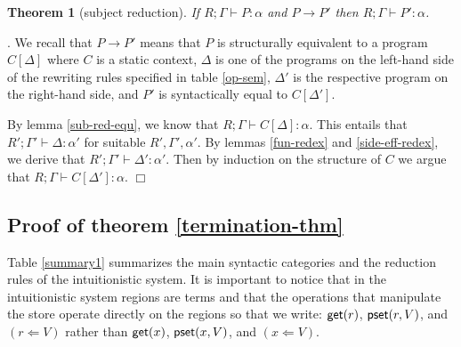 \documentclass[11pt]{article}
\newtheorem{theorem}{Theorem}
\newcommand{\Proof}{\noindent {\sc Proof}. }
\newcommand{\qed}{\hfill${\Box}$}
\newcommand{\Gives}{\vdash}             \newcommand{\IGives}{\vdash_{I}}        \newcommand{\AIGives}{\vdash_{{\it AI}}} \newcommand{\CGives}{\vdash_{C}}
\newcommand{\arrow}{\rightarrow}        \newcommand{\trarrow}{\stackrel{*}{\rightarrow}}        \newcommand{\limp}{\multimap} \newcommand{\bang}{\oc}
\newcommand{\pst}[2]{{\sf pset}(#1,#2)}
\newcommand{\get}[1]{{\sf get}(#1)}
\newcommand{\pstore}[2]{(#1 \Leftarrow #2)}
\begin{document}
\begin{theorem}[subject reduction]
  If $R;\Gamma\vdash P:\alpha$ and  $P \rightarrow P'$ then 
  $R;\Gamma\vdash P':\alpha$.
\end{theorem}
\Proof
We recall that $P\arrow P'$ means that 
$P$ is structurally equivalent to a program
$C[\Delta]$ where $C$ is a static context, $\Delta$ 
is one of the programs on the left-hand side of the
rewriting rules specified in table \ref{op-sem},
$\Delta'$ is the respective program on the right-hand side,
and $P'$ is syntactically equal to $C[\Delta']$.

By lemma \ref{sub-red-equ}, we know that 
$R;\Gamma \Gives C[\Delta]:\alpha$.
This entails that $R';\Gamma'\Gives \Delta : \alpha'$ for
suitable $R',\Gamma',\alpha'$.
By lemmas \ref{fun-redex} and \ref{side-eff-redex}, we derive that
$R';\Gamma'\Gives \Delta':\alpha'$.
Then by induction on the structure of $C$ we argue 
that $R;\Gamma \Gives C[\Delta']:\alpha$. \qed



\subsection{Proof of theorem \ref{termination-thm}}
Table \ref{summary1} summarizes the main syntactic categories and
the reduction rules of the intuitionistic system. 
It is important to notice that in the intuitionistic system
regions are terms and that the operations that manipulate the store
operate directly on the regions so that we write:
$\get{r}$, $\pst{r}{V}$, and $\pstore{r}{V}$ rather than
$\get{x}$, $\pst{x}{V}$, and $\pstore{x}{V}$. 
\end{document}
